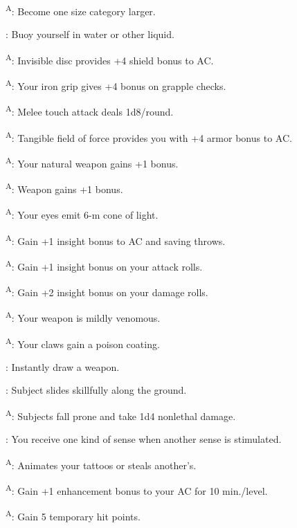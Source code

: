 \textsuperscript{A}: Become one size category larger.

: Buoy yourself in water or other liquid.

\textsuperscript{A}: Invisible disc provides +4 shield bonus to AC.

\textsuperscript{A}: Your iron grip gives +4 bonus on grapple checks.

\textsuperscript{A}: Melee touch attack deals 1d8/round.

\textsuperscript{A}: Tangible field of force provides you with +4 armor bonus to AC.

\textsuperscript{A}: Your natural weapon gains +1 bonus.

\textsuperscript{A}: Weapon gains +1 bonus.

\textsuperscript{A}: Your eyes emit 6-m cone of light.

\textsuperscript{A}: Gain +1 insight bonus to AC and saving throws.

\textsuperscript{A}: Gain +1 insight bonus on your attack rolls.

\textsuperscript{A}: Gain +2 insight bonus on your damage rolls.

\textsuperscript{A}: Your weapon is mildly venomous.

\textsuperscript{A}: Your claws gain a poison coating.

: Instantly draw a weapon. %

: Subject slides skillfully along the ground.

\textsuperscript{A}: Subjects fall prone and take 1d4 nonlethal damage.

: You receive one kind of sense when another sense is stimulated.

\textsuperscript{A}: Animates your tattoos or steals another's. %

\textsuperscript{A}: Gain +1 enhancement bonus to your AC for 10 min./level.

\textsuperscript{A}: Gain 5 temporary hit points.

